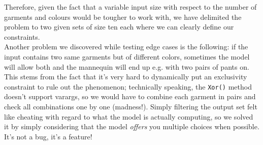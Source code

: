 \documentclass[12pt]{article}
\begin{document}
Therefore, given the fact that a variable input size with respect to the number of garments and colours would be tougher to work with, we have delimited the problem to two given sets of size ten each where we can clearly define our constraints.\\

Another problem we discovered while testing edge cases is the following: if the input contains two same garments but of different colors, sometimes the model will allow both and the mannequin will end up e.g. with two pairs of pants on. This stems from the fact that it's very hard to dynamically put an exclusivity constraint to rule out the phenomenon; technically speaking, the \texttt{Xor()} method doesn't support varargs, so we would have to combine each garment in pairs and check all combinations one by one (madness!). Simply filtering the output set felt like cheating with regard to what the model is actually computing, so we solved it by simply considering that the model \textit{offers} you multiple choices when possible. It's not a bug, it's a feature!\\
\end{document}
